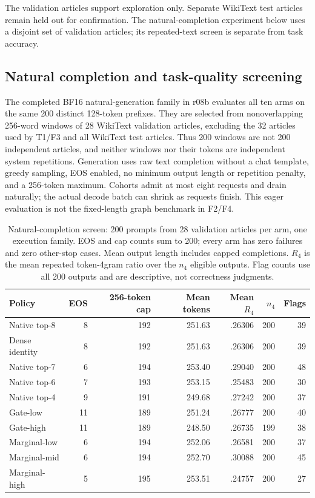\documentclass[10pt,twocolumn]{article}
\begin{document}
The validation articles support exploration only. Separate WikiText test articles remain held out for confirmation. The natural-completion experiment below uses a disjoint set of validation articles; its repeated-text screen is separate from task accuracy.

\subsection{Natural completion and task-quality screening}
The completed BF16 natural-generation family in r08b evaluates all ten arms on the same 200 distinct 128-token prefixes. They are selected from nonoverlapping 256-word windows of 28 WikiText validation articles, excluding the 32 articles used by T1/F3 and all WikiText test articles. Thus 200 windows are not 200 independent articles, and neither windows nor their tokens are independent system repetitions. Generation uses raw text completion without a chat template, greedy sampling, EOS enabled, no minimum output length or repetition penalty, and a 256-token maximum. Cohorts admit at most eight requests and drain naturally; the actual decode batch can shrink as requests finish. This eager evaluation is not the fixed-length graph benchmark in F2/F4.

\begin{table}[tp]\centering\small
\caption{Natural-completion screen: 200 prompts from 28 validation articles per arm, one execution family. EOS and cap counts sum to 200; every arm has zero failures and zero other-stop cases. Mean output length includes capped completions. $R_4$ is the mean repeated token-4gram ratio over the $n_4$ eligible outputs. Flag counts use all 200 outputs and are descriptive, not correctness judgments.}\label{tab:free200}
\begin{tabular}{lrrrrrr}\toprule
Policy & EOS & 256-token cap & Mean tokens & Mean $R_4$ & $n_4$ & Flags\\\midrule
Native top-8 & 8 & 192 & 251.63 & .26306 & 200 & 39\\
Dense identity & 8 & 192 & 251.63 & .26306 & 200 & 39\\
Native top-7 & 6 & 194 & 253.40 & .29040 & 200 & 48\\
Native top-6 & 7 & 193 & 253.15 & .25483 & 200 & 30\\
Native top-4 & 9 & 191 & 249.68 & .27242 & 200 & 37\\
Gate-low & 11 & 189 & 251.24 & .26777 & 200 & 40\\
Gate-high & 11 & 189 & 248.50 & .26735 & 199 & 38\\
Marginal-low & 6 & 194 & 252.06 & .26581 & 200 & 37\\
Marginal-mid & 6 & 194 & 252.70 & .30088 & 200 & 45\\
Marginal-high & 5 & 195 & 253.51 & .24757 & 200 & 27\\\bottomrule
\end{tabular}\end{table}
\end{document}
